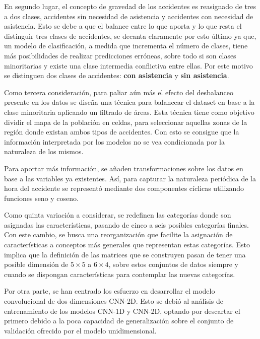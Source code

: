 En segundo lugar, el concepto de gravedad de los accidentes es reasignado de tres a dos clases, accidentes sin necesidad de asistencia y accidentes con necesidad de asistencia. Esto se debe a que el balance entre lo que aporta y lo que resta el distinguir tres clases de accidentes, se decanta claramente por esto último ya que, un modelo de clasificación, a medida que incrementa el número de clases, tiene más posibilidades de realizar predicciones erróneas, sobre todo si son clases minoritarias y existe una clase intermedia conflictiva entre ellas. Por este motivo se distinguen dos clases de accidentes: \textbf{con asistencia} y \textbf{sin asistencia}.

Como tercera consideración, para paliar aún más el efecto del desbalanceo presente en los datos se diseña una técnica para balancear el dataset en base a la clase minoritaria aplicando un filtrado de áreas. Esta técnica tiene como objetivo dividir el mapa de la población en celdas, para seleccionar aquellas zonas de la región donde existan ambos tipos de accidentes. Con esto se consigue que la información interpretada por los modelos no se vea condicionada por la naturaleza de los mismos.

Para aportar más información, se añaden transformaciones sobre los datos en base a las variables ya existentes. Así, para capturar la naturaleza periódica de la hora del accidente se representó mediante dos componentes cíclicas utilizando funciones seno y coseno. 



Como quinta variación a considerar, se redefinen las categorías donde son asignadas las características, pasando de cinco a seis posibles categorías finales. Con este cambio, se busca una reorganización que facilite la asignación de características a conceptos más generales que representan estas categorías. Esto implica que la definición de las matrices que se construyen pasan de tener una posible dimensión de $5\times5$ a $6\times4$, sobre estos conjuntos de datos siempre y cuando se dispongan características para contemplar las nuevas categorías.

Por otra parte, se han centrado los esfuerzo en desarrollar el modelo convolucional de dos dimensiones CNN-2D. Esto se debió al análisis de entrenamiento de los modelos CNN-1D y CNN-2D, optando por descartar el primero debido a la poca capacidad de generalización sobre el conjunto de validación ofrecido por el modelo unidimensional.

